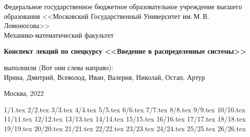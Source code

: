 \documentclass[specialist, subf, href, colorlinks=true, 12pt, times, mtpro, final]{disser}
\theoremstyle{definition}
\begin{document}
\begin{titlepage}
	\begin{center}
		
		Федеральное государственное бюджетное образовательное учреждение высшего образования 
		<<Московский Государственный Университет им.\,М.\,В.\,Ломоносова>>\\
		
		\vspace{9cm}
		Механико-математический факультет
		
		{\bf Конспект лекций по спецкурсу <<Введение в распределенные системы>>}
		
		\vspace{9cm}
		\begin{flushright}
			{ выполнили (Вот они слева направо):}\\
			Ирина, Дмитрий, Всеволод, Иван, Валерия, Николай, Остап, Артур\\[0.5cm]
		\end{flushright}
		\vspace{1cm}
		
		\normalsize Москва, 2022
	\end{center}
\end{titlepage}

	
\tableofcontents
	
 {1/1.tex}
 {2/2.tex}
 {3/3.tex}
 {4/4.tex}
 {5/5.tex}
 {6/6.tex}
 {7/7.tex}
 {8/8.tex}
 {9/9.tex}
 {10/10.tex}
 {11/11.tex}
 {12/12.tex}
 {13/13.tex}
 {14/14.tex}
 {15/15.tex}
 {16/16.tex}
 {17/17.tex}
 {18/18.tex}
 {19/19.tex}
 {20/20.tex}
 {21/21.tex}
 {22/22.tex}
 {23/23.tex}
 {24/24.tex}
 {25/25.tex}
 {26/26.tex}
\end{document}
